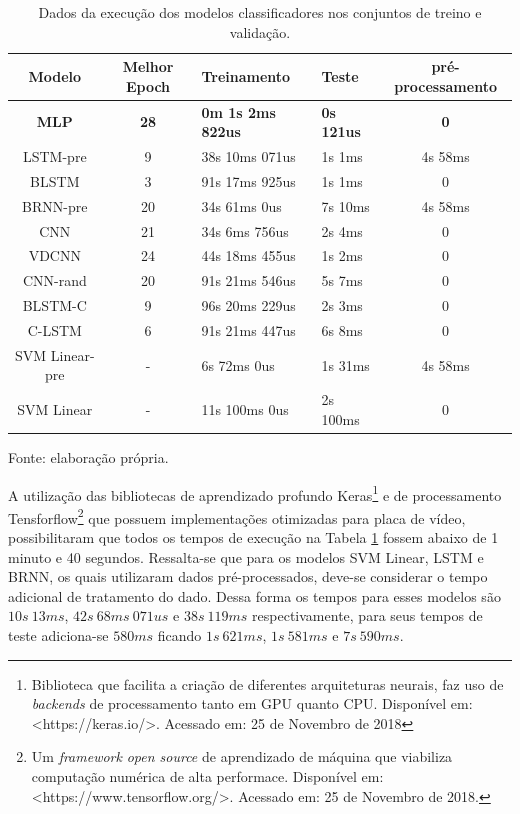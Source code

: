 \begin{table}[ht]
    \centering
    \caption[Resultados dos modelos classificadores nos conjuntos de treino e validação]{Dados da execução dos modelos classificadores nos conjuntos de treino e validação.}
    \label{tab:execucaoModelos}
    \begin{tabular}{|c|c|l|l|c|}
        \hline
        Modelo & Melhor Epoch & Treinamento & Teste & pré-processamento \\
        \hline
        \textbf{MLP} & \textbf{28} & \textbf{0m 1s 2ms 822us} & \textbf{0s 121us} & \textbf{0} \\
        \hline
        LSTM-pre & 9 & 38s 10ms 071us & 1s 1ms & 4s 58ms  \\
        \hline
        BLSTM & 3 & 91s 17ms 925us & 1s 1ms & 0 \\
        \hline
        BRNN-pre & 20 & 34s 61ms 0us & 7s 10ms & 4s 58ms \\
        \hline
        CNN & 21 & 34s 6ms 756us & 2s 4ms & 0 \\
        \hline
        VDCNN & 24 & 44s 18ms 455us & 1s 2ms & 0 \\
        \hline
        CNN-rand &	20 & 91s 21ms 546us & 5s 7ms & 0 \\
        \hline
        BLSTM-C	& 9 & 96s 20ms 229us & 2s 3ms & 0 \\
        \hline
        C-LSTM & 6 & 91s 21ms 447us & 6s 8ms & 0 \\
        \hline
        SVM Linear-pre & - & 6s 72ms 0us & 1s 31ms & 4s 58ms \\
        \hline
        SVM Linear & - &  11s 100ms 0us & 2s 100ms & 0\\
        \hline
    \end{tabular}\par Fonte: elaboração própria.
\end{table}

A utilização das bibliotecas de aprendizado profundo Keras\footnote{Biblioteca que facilita a criação de diferentes arquiteturas neurais, faz uso de \textit{backends} de processamento tanto em GPU quanto CPU. Disponível em: <https://keras.io/>. Acessado em: 25 de Novembro de 2018} e de processamento Tensforflow\footnote{Um \textit{framework} \textit{open source} de aprendizado de máquina que viabiliza computação numérica de alta performace. Disponível em: <https://www.tensorflow.org/>. Acessado em: 25 de Novembro de 2018.} que possuem implementações otimizadas para placa de vídeo, possibilitaram que todos os tempos de execução na Tabela \ref{tab:execucaoModelos} fossem abaixo de 1 minuto e 40 segundos. Ressalta-se que para os modelos SVM Linear, LSTM e BRNN, os quais utilizaram dados pré-processados, deve-se considerar o tempo adicional de tratamento do dado. Dessa forma os tempos para esses modelos são $10s\ 13ms$, $42s\ 68ms\ 071us$ e $38s\ 119ms$ respectivamente, para seus tempos de teste adiciona-se $580ms$ ficando $1s\ 621ms$, $1s\ 581ms$ e $7s\ 590ms$.

